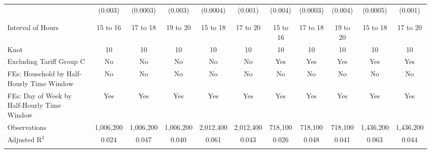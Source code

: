 \begin{table}[!htbp]
\begin{longtable}{@{\extracolsep{0pt}}lcccccccccc}
  & (0.003) & (0.0003) & (0.003) & (0.0004) & (0.001) & (0.004) & (0.0003) & (0.004) & (0.0005) & (0.001) \\ 
  & & & & & & & & & & \\ 
\hline \\[-1.8ex] 
Interval of Hours & 15 to 16 & 17 to 18 & 19 to 20 & 15 to 18 & 17 to 20 & 15 to 16 & 17 to 18 & 19 to 20 & 15 to 18 & 17 to 20 \\ 
Knot & 10 & 10 & 10 & 10 & 10 & 10 & 10 & 10 & 10 & 10 \\ 
Excluding Tariff Group C & No & No & No & No & No & Yes & Yes & Yes & Yes & Yes \\ 
FEs: Household by Half-Hourly Time Window & No & No & No & No & No & No & No & No & No & No \\ 
FEs: Day of Week by Half-Hourly Time Window & Yes & Yes & Yes & Yes & Yes & Yes & Yes & Yes & Yes & Yes \\ 
Observations & 1,006,200 & 1,006,200 & 1,006,200 & 2,012,400 & 2,012,400 & 718,100 & 718,100 & 718,100 & 1,436,200 & 1,436,200 \\ 
Adjusted R$^{2}$ & 0.024 & 0.047 & 0.040 & 0.061 & 0.043 & 0.026 & 0.048 & 0.041 & 0.063 & 0.044 \\ 
\hline 
\hline \\[-1.8ex] 
\end{longtable} 
\end{table} 
